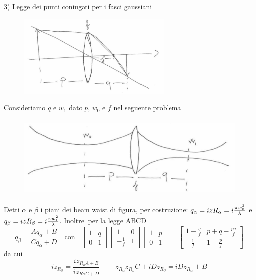 3) Legge dei punti coniugati per i fasci gaussiani
\begin{figure}[H]
\centering
\includegraphics[height=4cm]{images/5}
\end{figure}
Consideriamo $q$ e $w_1$ dato $p$, $w_0$ e $f$ nel seguente problema
\begin{figure}[H]
\centering
\includegraphics[height=4cm]{images/6}
\end{figure}
Detti $\alpha$ e $\beta$ i piani dei beam waist di figura, per costruzione: $q_\alpha = izR_\alpha =i\frac{\pi w_0^2}{\lambda}$ e $q_\beta = izR_\beta = i\frac{\pi w_1^2}{\lambda}$.
Inoltre, per la legge ABCD
\begin{equation*}
q_\beta = \frac{Aq_\alpha + B}{Cq_\alpha + D} \quad \text{con} \quad
\begin{bmatrix}
1	&	q\\
0	&	1
\end{bmatrix} \begin{bmatrix}
1	&	0\\
-\frac{1}{f}	&	1
\end{bmatrix} \begin{bmatrix}
1	&	p\\
0	&	1
\end{bmatrix}
=
\begin{bmatrix}
1-\frac{q}{f}	&	p + q - \frac{pq}{f}\\
-\frac{1}{f}	&	1 - \frac{p}{f}
\end{bmatrix}
\end{equation*}
da cui
\begin{equation*}
iz_{R_\beta} = \frac{iz_{R_\alpha A + B}}{iz_{R\alpha C + D}}\quad -z_{R_\alpha} z_{R_\beta} C +iDz_{R_\beta} = iDz_{R_\alpha} + B
\end{equation*}
